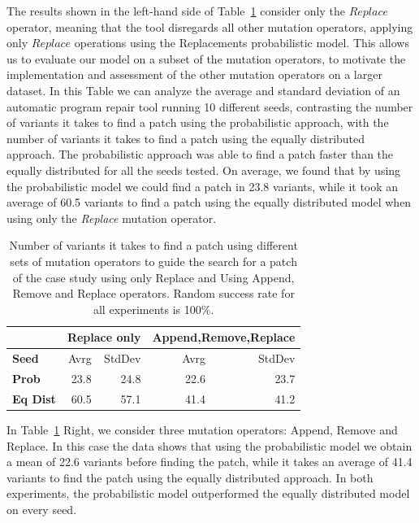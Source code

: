 \documentclass[conference]{IEEEtran}
\begin{document}
The results shown in the left-hand side of Table~\ref{fig:resultsReplace} consider only the $Replace$ operator, meaning that the tool disregards all other mutation 
operators, applying only $Replace$ operations using the Replacements probabilistic model.
This allows us to evaluate our model on a 
subset of the mutation operators, to motivate the implementation and assessment of the other mutation operators on a larger dataset. 
%
In this Table we can analyze the average and standard deviation of an automatic program repair tool running 10 different seeds, contrasting the 
number of variants it takes to find a patch using the probabilistic approach, with the number of variants it takes to find a patch using the 
equally distributed approach. 
%
The probabilistic approach was able to find a 
patch faster than the equally distributed for all the seeds tested. On average,
we found that by using the probabilistic model we  
could find a patch in 23.8 variants, while it took an average of 60.5 variants 
to find a patch using the equally distributed model when using only the \emph{Replace} mutation operator.


\begin{table}[ht]
\centering
\begin{tabular}{l|rr|rr}
  & \multicolumn{2}{c|}{Replace only} & \multicolumn{2}{c}{Append,Remove,Replace} \\
\hline
\textbf{Seed}& Avrg & StdDev & Avrg & StdDev\\
\hline
\textbf{Prob} & 23.8 & 24.8  & 22.6 & 23.7  \\

\textbf{Eq Dist} & 60.5 & 57.1 & 41.4 & 41.2 \\
\hline
\end{tabular}
\newline
\center
  \caption{Number of variants it takes to find a patch using different sets of
    mutation operators to guide the search for a patch of the case study using
    only Replace and Using Append, Remove and Replace operators. Random success
    rate for all experiments is 100\%. }
  \label{fig:resultsReplace}
\end{table} 


In Table~\ref{fig:resultsReplace} Right, we consider three mutation operators: Append, 
Remove and Replace. In this case the data 
shows that using the probabilistic model we obtain a mean of 22.6 variants 
before finding the patch, while it takes an average of 41.4 variants to find the 
patch using the equally distributed approach. In both experiments, the
probabilistic model outperformed the equally distributed model on every seed.
\end{document}

